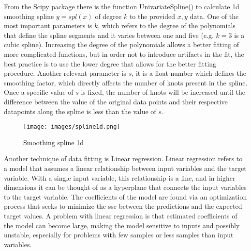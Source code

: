 \noindent From the Scipy package there is the function UnivariateSpline() to calculate \gls{1d} smoothing spline $y = spl(x)$ of degree $k$ to the provided $x, y$ data. One of the most important parameters is $k$, which refers to the degree of the polynomials that define the spline segments and it varies between one and five (e.g. $k = 3$ is a cubic spline). Increasing the degree of the polynomials allows a better fitting of more complicated functions, but in order not to introduce artifacts in the fit, the best practice is to use the lower degree that allows for the better fitting procedure. Another relevant parameter is $s$, it is a float number which defines the smoothing factor, which directly affects the number of knots present in the spline. Once a specific value of $s$ is fixed, the number of knots will be increased until the difference between the value of the original data points and their respective datapoints along the spline is less than the value of $s$.

\begin{figure}[H]
	\centering
	\texttt{[image: images/spline1d.png]}
	\caption[Smoothing spline 1D.]{Smoothing spline \gls{1d}}
	\label{fig:spline1d}
\end{figure}

\noindent Another technique of data fitting is Linear regression. Linear regression refers to a model that assumes a linear relationship between input variables and the target variable. With a single input variable, this relationship is a line, and in higher dimensions it can be thought of as a hyperplane that connects the input variables to the target variable. The coefficients of the model are found via an optimization process that seeks to minimize the \gls{sse} between the predictions and the expected target values. A problem with linear regression is that estimated coefficients of the model can become large, making the model sensitive to inputs and possibly unstable, especially for problems with few samples or less samples than input variables. \\

